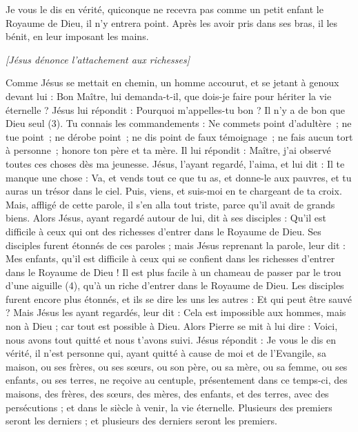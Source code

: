 \begin{multicols}{2}
Je vous le dis en vérité, quiconque ne recevra pas comme un petit enfant le Royaume de Dieu, il n'y entrera point.
Après les avoir pris dans ses bras, il les bénit, en leur imposant les mains.
\begin{center}
\textit{[Jésus dénonce l'attachement aux richesses]}
\end{center}
\PPE{}
Comme Jésus se mettait en chemin, un homme accourut, et se jetant à genoux devant lui : Bon Maître, lui demanda-t-il, que dois-je faire pour hériter la vie éternelle ?
Jésus lui répondit : Pourquoi m'appelles-tu bon ? Il n'y a de bon que Dieu seul (3).
Tu connais les commandements : Ne commets point d’adultère ; ne tue point ; ne dérobe point ; ne dis point de faux témoignage ; ne fais aucun tort à personne ; honore ton père et ta mère.
Il lui répondit : Maître, j'ai observé toutes ces choses dès ma jeunesse.
Jésus, l’ayant regardé, l'aima, et lui dit : Il te manque une chose : Va, et vends tout ce que tu as, et donne-le aux pauvres, et tu auras un trésor dans le ciel. Puis, viens, et suis-moi en te chargeant de ta croix.
Mais, affligé de cette parole, il s'en alla tout triste, parce qu'il avait de grands biens.
Alors Jésus, ayant regardé autour de lui, dit à ses disciples : Qu’il est difficile à ceux qui ont des richesses d’entrer dans le Royaume de Dieu.
Ses disciples furent étonnés de ces paroles ; mais Jésus reprenant la parole, leur dit : Mes enfants, qu'il est difficile à ceux qui se confient dans les richesses d'entrer dans le Royaume de Dieu !
Il est plus facile à un chameau de passer par le trou d'une aiguille (4), qu’à un riche d’entrer dans le Royaume de Dieu.
Les disciples furent encore plus étonnés, et ils se dire les uns les autres : Et qui peut être sauvé ?
Mais Jésus les ayant regardés, leur dit : Cela est impossible aux hommes, mais non à Dieu ; car tout est possible à Dieu.
Alors Pierre se mit à lui dire : Voici, nous avons tout quitté et nous t'avons suivi.
Jésus répondit : Je vous le dis en vérité, il n’est personne qui, ayant quitté à cause de moi et de l’Evangile, sa maison, ou ses frères, ou ses sœurs, ou son père, ou sa mère, ou sa femme, ou ses enfants, ou ses terres,
ne reçoive au centuple, présentement dans ce temps-ci, des maisons, des frères, des sœurs, des mères, des enfants, et des terres, avec des persécutions ; et dans le siècle à venir, la vie éternelle.
Plusieurs des premiers seront les derniers ; et plusieurs des derniers seront les premiers.
\begin{center}

\end{center}
\end{multicols}
